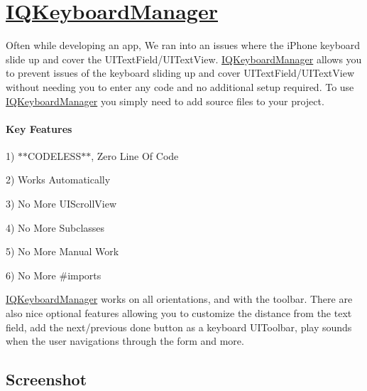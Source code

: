  

\section*{\mbox{\hyperlink{interface_i_q_keyboard_manager}{I\+Q\+Keyboard\+Manager}}}



\href{https://travis-ci.org/hackiftekhar/IQKeyboardManager}{\tt } \href{https://coveralls.io/r/hackiftekhar/IQKeyboardManager?branch=master}{\tt } \href{https://landscape.io/github/hackiftekhar/IQKeyboardManager/master}{\tt }

Often while developing an app, We ran into an issues where the i\+Phone keyboard slide up and cover the {\ttfamily U\+I\+Text\+Field/\+U\+I\+Text\+View}. {\ttfamily \mbox{\hyperlink{interface_i_q_keyboard_manager}{I\+Q\+Keyboard\+Manager}}} allows you to prevent issues of the keyboard sliding up and cover {\ttfamily U\+I\+Text\+Field/\+U\+I\+Text\+View} without needing you to enter any code and no additional setup required. To use {\ttfamily \mbox{\hyperlink{interface_i_q_keyboard_manager}{I\+Q\+Keyboard\+Manager}}} you simply need to add source files to your project.

\paragraph*{Key Features}

\href{http://issuestats.com/github/hackiftekhar/iqkeyboardmanager}{\tt } \href{http://issuestats.com/github/hackiftekhar/iqkeyboardmanager}{\tt }

1) {\ttfamily $\ast$$\ast$\+C\+O\+D\+E\+L\+E\+S\+S$\ast$$\ast$, Zero Line Of Code}

2) {\ttfamily Works Automatically}

3) {\ttfamily No More U\+I\+Scroll\+View}

4) {\ttfamily No More Subclasses}

5) {\ttfamily No More Manual Work}

6) {\ttfamily No More \#imports}

{\ttfamily \mbox{\hyperlink{interface_i_q_keyboard_manager}{I\+Q\+Keyboard\+Manager}}} works on all orientations, and with the toolbar. There are also nice optional features allowing you to customize the distance from the text field, add the next/previous done button as a keyboard U\+I\+Toolbar, play sounds when the user navigations through the form and more.

\subsection*{Screenshot}


